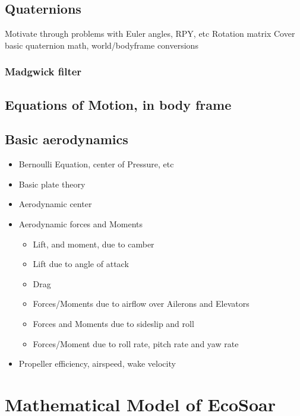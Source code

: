 \documentclass{article}
\begin{document}
\subsection{Quaternions}
Motivate through problems with Euler angles, RPY, etc
Rotation matrix
Cover basic quaternion math,
world/bodyframe conversions
\subsubsection{Madgwick filter}
\subsection{Equations of Motion, in body frame}


\subsection {Basic aerodynamics}

\begin{itemize}
        \item Bernoulli Equation, center of Pressure, etc
        \item Basic plate theory
        \item Aerodynamic center    
        \item Aerodynamic forces and Moments
        \begin{itemize}
            \item Lift, and moment, due to camber
            \item Lift due to angle of attack
            \item Drag
            \item Forces/Moments due to airflow over Ailerons and Elevators
            \item Forces and Moments due to sideslip and roll
            \item Forces/Moment due to roll rate, pitch rate and yaw rate
        \end{itemize}
        \item Propeller efficiency, airspeed, wake velocity
    \end{itemize}

\section{Mathematical Model of EcoSoar}





\end{document}
